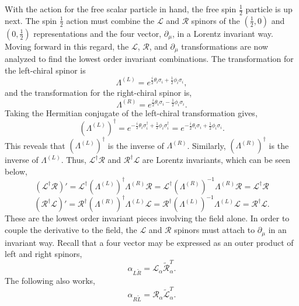 \documentclass[12pt]{article}
\begin{document}
With the action for the free scalar particle in hand, the free spin $\frac{1}{2}$ particle is up next. The spin $\frac{1}{2}$ action must combine the $\mathcal{L}$ and $\mathcal{R}$ spinors of the $(\frac{1}{2}, 0)$ and $(0, \frac{1}{2})$ representations and the four vector, $\partial_\mu$, in a Lorentz invariant way. Moving forward in this regard, the $\mathcal{L}$, $\mathcal{R}$, and $\partial_\mu$ transformations are now analyzed to find the lowest order invariant combinations. The transformation for the left-chiral spinor is 
\begin{equation}
\Lambda^{(L)} = e^{\frac{i}{2}\theta_i \sigma_i + \frac{1}{2}\phi_i \sigma_i},
\end{equation}
and the transformation for the right-chiral spinor is,
\begin{equation}
\Lambda^{(R)} = e^{\frac{i}{2}\theta_i \sigma_i - \frac{1}{2}\phi_i \sigma_i}.
\end{equation}
Taking the Hermitian conjugate of the left-chiral transformation gives,
\begin{equation}
(\Lambda^{(L)})^\dagger = e^{-\frac{i}{2}\theta_i \sigma_i^\dagger + \frac{1}{2}\phi_i \sigma_i^\dagger} 
= e^{-\frac{i}{2}\theta_i \sigma_i + \frac{1}{2}\phi_i \sigma_i}.
\end{equation}
This reveals that $(\Lambda^{(L)})^\dagger$ is the inverse of $\Lambda^{(R)}$. Similarly, $(\Lambda^{(R)})^\dagger$ is the inverse of $\Lambda^{(L)}$. Thus, $\mathcal{L}^\dagger\mathcal{R}$ and $\mathcal{R}^\dagger\mathcal{L}$ are Lorentz invariants, which can be seen below,
\begin{equation}
(\mathcal{L}^\dagger\mathcal{R})' = \mathcal{L}^\dagger (\Lambda^{(L)})^\dagger \Lambda^{(R)} \mathcal{R} 
= \mathcal{L}^\dagger (\Lambda^{(R)})^{-1} \Lambda^{(R)} \mathcal{R} = \mathcal{L}^\dagger \mathcal{R}  
\end{equation}
\begin{equation}
(\mathcal{R}^\dagger\mathcal{L})' = \mathcal{R}^\dagger (\Lambda^{(R)})^\dagger \Lambda^{(L)} \mathcal{L} 
= \mathcal{R}^\dagger (\Lambda^{(L)})^{-1} \Lambda^{(L)} \mathcal{L} = \mathcal{R}^\dagger \mathcal{L}. 
\end{equation}
These are the lowest order invariant pieces involving the field alone. In order to couple the derivative to the field, the $\mathcal{L}$ and $\mathcal{R}$ spinors must attach to $\partial_\mu$ in an invariant way. Recall that a four vector may be expressed as an outer product of left and right spinors, 
\begin{equation}
\alpha_{L\tilde{R}} = \mathcal{L}_\alpha \tilde{\mathcal{R}}_\alpha^{T}.
\end{equation}
The following also works, 
\begin{equation}
\alpha_{R\tilde{L}} = \mathcal{R}_\alpha \tilde{\mathcal{L}}_\alpha^{T}.
\end{equation}
\end{document}
